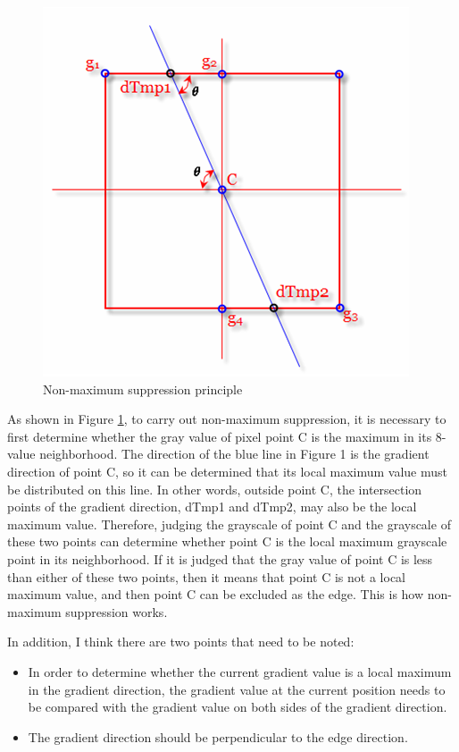 \documentclass[review]{cvpr}
\begin{document}
\begin{figure}[htbp]
\centering
  \includegraphics[scale=0.5]{../../figure/1.png}
  \caption{Non-maximum suppression principle}
  \label{fig1}
\end{figure}

As shown in Figure \ref{fig1}, to carry out non-maximum suppression, it is necessary to first determine whether the gray value of pixel point C is the maximum in its 8-value neighborhood. The direction of the blue line in Figure 1 is the gradient direction of point C, so it can be determined that its local maximum value must be distributed on this line. In other words, outside point C, the intersection points of the gradient direction, dTmp1 and dTmp2, may also be the local maximum value. Therefore, judging the grayscale of point C and the grayscale of these two points can determine whether point C is the local maximum grayscale point in its neighborhood. If it is judged that the gray value of point C is less than either of these two points, then it means that point C is not a local maximum value, and then point C can be excluded as the edge. This is how non-maximum suppression works.

In addition, I think there are two points that need to be noted:

\begin{itemize}
  \item In order to determine whether the current gradient value is a local maximum in the gradient direction, the gradient value at the current position needs to be compared with the gradient value on both sides of the gradient direction.
  \item The gradient direction should be perpendicular to the edge direction.
\end{itemize}
\end{document}
